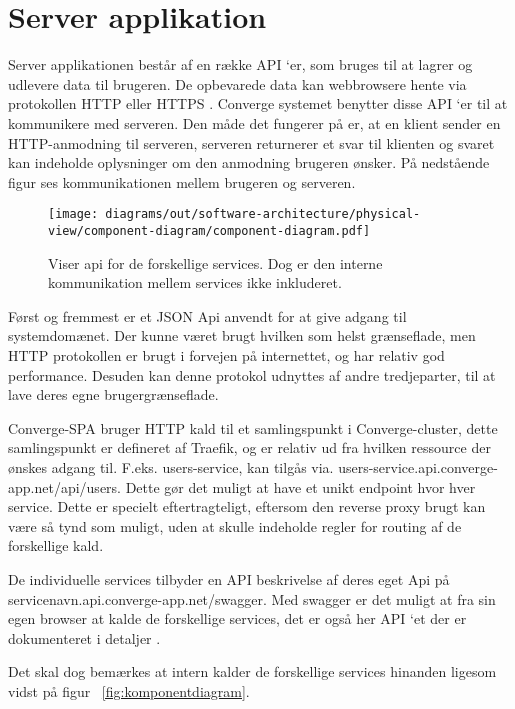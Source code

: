 \section{Server applikation}

Server applikationen består af en række API ‘er, som bruges til at lagrer og udlevere data til brugeren. De opbevarede data kan webbrowsere hente via protokollen HTTP eller HTTPS \cite[HTTP]{converge-terms} . Converge systemet benytter disse API ‘er til at kommunikere med serveren. Den måde det fungerer på er, at en klient sender en HTTP-anmodning til serveren, serveren returnerer et svar til klienten og svaret kan indeholde oplysninger om den anmodning brugeren ønsker. På nedstående figur ses kommunikationen mellem brugeren og serveren.

\begin{figure}[H]
    \centering
  \texttt{[image: diagrams/out/software-architecture/physical-view/component-diagram/component-diagram.pdf]}
  \caption{Viser api for de forskellige services. Dog er den interne kommunikation mellem services ikke inkluderet.}
  \label{fig:component-api}
  \end{figure}

Først og fremmest er et JSON Api anvendt for at give adgang til systemdomænet. Der kunne været brugt hvilken som helst grænseflade, men HTTP protokollen er brugt i forvejen på internettet, og har relativ god performance. Desuden kan denne protokol udnyttes af andre tredjeparter, til at lave deres egne brugergrænseflade.

Converge-SPA bruger HTTP kald til et samlingspunkt i Converge-cluster, dette samlingspunkt er defineret af Traefik, og er relativ ud fra hvilken ressource der ønskes adgang til. F.eks. users-service, kan tilgås via. users-service.api.converge-app.net/api/users. Dette gør det muligt at have et unikt endpoint hvor hver service. Dette er specielt eftertragteligt, eftersom den reverse proxy brugt kan være så tynd som muligt, uden at skulle indeholde regler for routing af de forskellige kald.

De individuelle services tilbyder en API beskrivelse af deres eget Api på servicenavn.api.converge-app.net/swagger. Med swagger er det muligt at fra sin egen browser at kalde de forskellige services, det er også her API ‘et der er dokumenteret i detaljer \cite{swagger}.

Det skal dog bemærkes at intern kalder de forskellige services hinanden ligesom vidst på figur ~\ref{fig:komponentdiagram}.